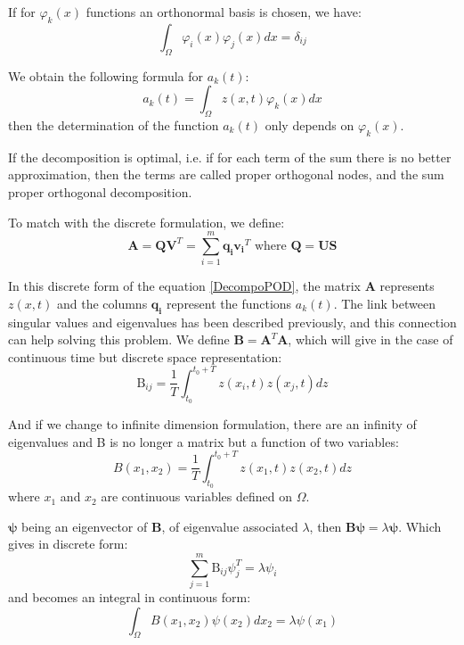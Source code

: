 \documentclass[12pt,a4paper]{article}
\begin{document}
If for $\varphi_k(x)$ functions an orthonormal basis is chosen, we have:
\begin{equation}
\int_\Omega \varphi_i(x) \varphi_j(x) dx = \delta_{ij}
\end{equation}

\noindent
We obtain the following formula for $a_k(t)$:
\begin{equation}
	a_k(t) = \int_\Omega z(x,t) \varphi_k(x) dx 
\end{equation}
then the determination of the function $a_k(t)$ only depends on $\varphi_k(x)$.

If the decomposition is optimal, i.e. if for each term of the sum there is no better approximation, then the terms are called proper orthogonal nodes, and the sum proper orthogonal decomposition.

\noindent
To match with the discrete formulation, we define:
\begin{equation}
	\mathbf{A} 	= \mathbf{Q} \mathbf{V}^T 
				= \sum_{i=1}^m \mathbf{q_i} \mathbf{v_i}^T
		\text{ where } \mathbf{Q} = \mathbf{U}\mathbf{S}
\end{equation}

In this discrete form of the equation \ref{DecompoPOD}, the matrix $\mathbf{A}$ represents $z(x,t)$ and the columns $\mathbf{q_i}$ represent the functions $a_k(t)$. 
The link between singular values and eigenvalues has been described previously, and this connection can help solving this problem. We define $\mathbf{B} = \mathbf{A}^T \mathbf{A}$, which will give in the case of continuous time but discrete space representation:
\begin{equation}
	\text{B}_{ij} = \frac{1}{T} 
			\int_{t_0}^{t_0+T} z(x_i,t) z(x_j,t)dz
\end{equation}

And if we change to infinite dimension formulation, there are an infinity of eigenvalues and B is no longer a matrix but a function of two variables:
\begin{equation}
	B(x_1,x_2) = \frac{1}{T} 
			\int_{t_0}^{t_0+T} z(x_1,t) z(x_2,t)dz
\end{equation}
where $x_1$ and $x_2$ are continuous variables defined on $\Omega$. 

$\boldsymbol{\psi}$ being an eigenvector of $\mathbf{B}$, of eigenvalue associated $\lambda$, then $\mathbf{B}\boldsymbol{\psi} = \lambda\boldsymbol{\psi}$. Which gives in discrete form:
\begin{equation}
\sum^m_{j=1} \text{B}_{ij} \psi_j^T = \lambda\psi_i
\end{equation}
and becomes an integral in continuous form:
\begin{equation}
\int_\Omega B(x_1,x_2) \psi(x_2) dx_2 = \lambda\psi(x_1 )
\end{equation}
\end{document}
